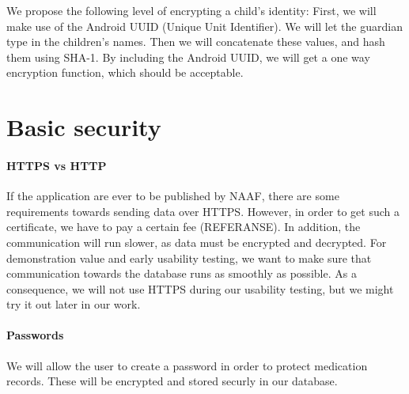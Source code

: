 We propose the following level of encrypting a child's identity:
First, we will make use of the Android UUID (Unique Unit Identifier). We will let the guardian type in the children's names. Then we will concatenate these values, and hash them using SHA-1. By including the Android UUID, we will get a one way encryption function, which should be acceptable.
 


\section{Basic security}
\paragraph{HTTPS vs HTTP} If the application are ever to be published by NAAF, there are some requirements towards sending data over HTTPS. However, in order to get such a certificate, we have to pay a certain fee (REFERANSE). In addition, the communication will run slower, as data must be encrypted and decrypted. For demonstration value and early usability testing, we want to make sure that communication towards the database runs as smoothly as possible. As a consequence, we will not use HTTPS during our usability testing, but we might try it out later in our work.


\paragraph{Passwords}
We will allow the user to create a password in order to protect medication records. These will be encrypted and stored securly in our database. 
